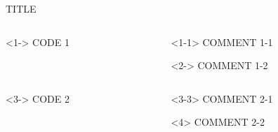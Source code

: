\begin{frame}[fragile]{TITLE}

\begin{columns}

\begin{column}[T]{0.48\textwidth}
\begin{onlyenv}<1->
CODE 1
\end{onlyenv}
\end{column}

\begin{column}[T]{0.48\textwidth}
\begin{onlyenv}<1-1>
COMMENT 1-1
\end{onlyenv}

\begin{onlyenv}<2->
COMMENT 1-2
\end{onlyenv}
\end{column}

\end{columns}

\begin{columns}

\begin{column}[T]{0.48\textwidth}
\begin{onlyenv}<3->
CODE 2
\end{onlyenv}
\end{column}

\begin{column}[T]{0.48\textwidth}
\begin{onlyenv}<3-3>
COMMENT 2-1
\end{onlyenv}

\begin{onlyenv}<4>
COMMENT 2-2
\end{onlyenv}
\end{column}

\end{columns}

\end{frame}
